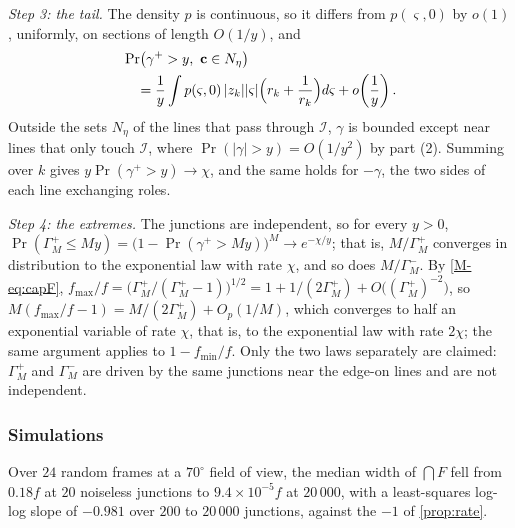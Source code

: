 \emph{Step 3: the tail.} The density $p$ is continuous, so it differs from $p(\varsigma,0)$ by $o(1)$, uniformly, on sections of length $O(1/y)$, and
\[
\begin{aligned}
&\Pr\bigl(\gamma^+>y,\ \mathbf{c}\in N_\eta\bigr)\\
&\quad=\frac1y\int p(\varsigma,0)\,|z_k||\varsigma|\Bigl(r_k+\frac1{r_k}\Bigr)d\varsigma+o\!\left(\frac1y\right).
\end{aligned}
\]
Outside the sets $N_\eta$ of the lines that pass through $\mathcal I$, $\gamma$ is bounded except near lines that only touch $\mathcal I$, where $\Pr(|\gamma|>y)=O(1/y^2)$ by part (2). Summing over $k$ gives $y\Pr(\gamma^+>y)\to\chi$, and the same holds for $-\gamma$, the two sides of each line exchanging roles.

\emph{Step 4: the extremes.} The junctions are independent, so for every $y>0$, $\Pr(\Gamma^+_M\le My)=\bigl(1-\Pr(\gamma^+>My)\bigr)^M\to e^{-\chi/y}$; that is, $M/\Gamma^+_M$ converges in distribution to the exponential law with rate $\chi$, and so does $M/\Gamma^-_M$. By \eqref{M-eq:capF}, $f_{\max}/f=\bigl(\Gamma^+_M/(\Gamma^+_M-1)\bigr)^{1/2}=1+1/(2\Gamma^+_M)+O\bigl((\Gamma^+_M)^{-2}\bigr)$, so $M(f_{\max}/f-1)=M/(2\Gamma^+_M)+O_p(1/M)$, which converges to half an exponential variable of rate $\chi$, that is, to the exponential law with rate $2\chi$; the same argument applies to $1-f_{\min}/f$. Only the two laws separately are claimed: $\Gamma^+_M$ and $\Gamma^-_M$ are driven by the same junctions near the edge-on lines and are not independent.

\subsubsection{Simulations}
Over $24$ random frames at a $70^\circ$ field of view, the median width of $\bigcap F$ fell from $0.18f$ at $20$ noiseless junctions to $9.4\times10^{-5}f$ at $20\,000$, with a least-squares log-log slope of $-0.981$ over $200$ to $20\,000$ junctions, against the $-1$ of \cref{prop:rate}.

